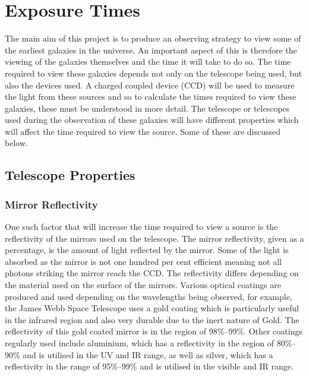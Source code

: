 
\section{Exposure Times} %
\label{sec:exposure_times}
	The main aim of this project is to produce an observing strategy to view some of the earliest galaxies in the universe. An important aspect of this is therefore the viewing of the galaxies themselves and the time it will take to do so. The time required to view these galaxies depends not only on the telescope being used, but also the devices used. A charged coupled device (CCD) will be used to measure the light from these sources and so to calculate the times required to view these galaxies, these must be understood in more detail. The telescope or telescopes used during the observation of these galaxies will have different properties which will affect the time required to view the source. Some of these are discussed below.

	\subsection{Telescope Properties} %
	\label{sub:telescope_properties}
		\subsubsection{Mirror Reflectivity} %
		\label{ssub:mirror_reflectivity}
			One such factor that will increase the time required to view a source is the reflectivity of the mirrors used on the telescope. The mirror reflectivity, given as a percentage, is the amount of light reflected by the mirror. Some of the light is absorbed as the mirror is not one hundred per cent efficient meaning not all photons striking the mirror reach the CCD. The reflectivity differs depending on the material used on the surface of the mirrors. Various optical coatings are produced and used depending on the wavelengths being observed, for example, the James Webb Space Telescope uses a gold coating which is particularly useful in the infrared region and also very durable due to the inert nature of Gold. The reflectivity of this gold coated mirror is in the region of 98\%--99\%\cite{Quantum_Coatings_Incorporated}. Other coatings regularly used include aluminium, which has a reflectivity in the region of 80\%--90\% and is utilised in the UV and IR range, as well as silver, which has a reflectivity in the range of 95\%--99\% and is utilised in the visible and IR range.

